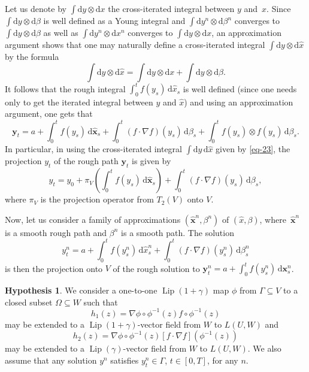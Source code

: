 \documentclass[a4paper,12pt]{article}
\theoremstyle{definition}
\newtheorem{hypothesis}{Hypothesis}
\newcommand{\vd}{\,\mathrm{d}}
\newcommand{\dd}{\mathrm{d}}
\newcommand{\bx}{\mathbf{x}}
\newcommand{\by}{\mathbf{y}}
\DeclareMathOperator{\Lip}{Lip}
\begin{document}
Let us denote by $\int \dd y\otimes\dd x$ the cross-iterated integral between $y$
and~$x$. Since 
$\int \dd y\otimes\dd \beta$ is well defined as a Young integral
and $\int \dd y^n\otimes\dd \beta^n$ converges to $\int \dd y\otimes\dd \beta$
as well as  $\int \dd y^n\otimes\dd x^n$ converges to $\int \dd y\otimes\dd x$, an approximation argument 
shows that one may naturally define a cross-iterated integral $\int \dd y\otimes\dd \widehat{x}$ by the formula
\begin{equation}
\label{eq-23}
\int \dd y\otimes\dd \widehat{x}=\int \dd y\otimes\dd x+\int \dd y\otimes\dd \beta.
\end{equation}
It follows that the rough integral $\int_0^t f(y_s)\vd \widehat{x}_s$
is well defined (since one needs only to get 
the iterated integral between $y$ and $\widehat{x}$)
and using an approximation argument, one gets that 
\begin{equation*}
\by_t=a+\int_0^t f(y_s)\vd \widehat{\bx}_s
+\int_0^t (f\cdot \nabla f)(y_s)\vd \beta_s
+\int_0^t f(y_s)\otimes f(y_s)\vd \beta_s.
\end{equation*}
In particular, in using the cross-iterated integral
$\int \dd y\vd\widehat{x}$ given by \eqref{eq-23}, the projection $y_t$
of the rough path $\by_t$ is given by 
\begin{equation*}
y_t=y_0+\pi_V\left(\int_0^t f(y_s)\vd \widehat{\bx}_s\right)+\int_0^t (f\cdot\nabla f)(y_s)\vd \beta_s,
\end{equation*}
where $\pi_V$ is the projection operator from $T_2(V)$ onto $V$.

Now, let us consider a family of approximations
$(\widehat{\bx}^n,\beta^n)$ of $(\widehat{x},\beta)$,
where~$\widehat{\bx}^n$ is a smooth rough path
and $\beta^n$ is a smooth path.
The solution 
\begin{equation*}
y^n_t=a+\int_0^t f(y^n_s)\vd \widehat{x}^n_s+\int_0^t (f\cdot\nabla f)(y^n_s)\vd \beta^n_s
\end{equation*}
is then the projection onto $V$ of the rough solution to 
$\by^n_t=a+\int_0^t f(y^n_s)\vd \bx^n_s$.

\begin{hypothesis}
\label{hyp-4}
We consider a  one-to-one $\Lip(1+\gamma)$ map $\phi$ from $\Gamma\subseteq V$ to a closed subset $\Omega\subseteq W$ such that 
\begin{equation}
\label{eq-28}
h_1(z)=\nabla \phi\circ \phi^{-1}(z)f\circ \phi^{-1}(z)
\end{equation}
may be extended to a $\Lip(1+\gamma)$-vector field from $W$ to $L(U,W)$  and
\begin{equation}
\label{eq-29}
h_2(z)=\nabla \phi\circ \phi^{-1}(z)[f\cdot \nabla f](\phi^{-1}(z))
\end{equation}
may be extended  to a $\Lip(\gamma)$-vector field from $W$ to $L(U,W)$.
We also assume that any solution $y^n$ satisfies $y^n_t\in\Gamma$, $t\in[0,T]$, 
for any $n$.
\end{hypothesis}
\end{document}
